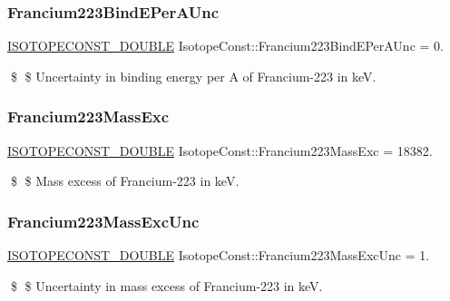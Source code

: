 \subsubsection{\texorpdfstring{Francium223\+Bind\+E\+Per\+A\+Unc}{Francium223BindEPerAUnc}}
{\footnotesize\ttfamily \mbox{\hyperlink{group___isotope_const-_macros_ga8f45a7272ce02c0b4c65c44636ed719a}{I\+S\+O\+T\+O\+P\+E\+C\+O\+N\+S\+T\+\_\+\+D\+O\+U\+B\+LE}} Isotope\+Const\+::\+Francium223\+Bind\+E\+Per\+A\+Unc = 0.}

\$ \$ Uncertainty in binding energy per A of Francium-\/223 in keV. \mbox{\label{group___isotope_const-_francium-_fr223_ga3b0e064faa8f2a4372383a56132e0f5d}} 
\subsubsection{\texorpdfstring{Francium223\+Mass\+Exc}{Francium223MassExc}}
{\footnotesize\ttfamily \mbox{\hyperlink{group___isotope_const-_macros_ga8f45a7272ce02c0b4c65c44636ed719a}{I\+S\+O\+T\+O\+P\+E\+C\+O\+N\+S\+T\+\_\+\+D\+O\+U\+B\+LE}} Isotope\+Const\+::\+Francium223\+Mass\+Exc = 18382.}

\$ \$ Mass excess of Francium-\/223 in keV. \mbox{\label{group___isotope_const-_francium-_fr223_ga5cfb08d0794e74ffe8cdfe5582f4e9ba}} 
\subsubsection{\texorpdfstring{Francium223\+Mass\+Exc\+Unc}{Francium223MassExcUnc}}
{\footnotesize\ttfamily \mbox{\hyperlink{group___isotope_const-_macros_ga8f45a7272ce02c0b4c65c44636ed719a}{I\+S\+O\+T\+O\+P\+E\+C\+O\+N\+S\+T\+\_\+\+D\+O\+U\+B\+LE}} Isotope\+Const\+::\+Francium223\+Mass\+Exc\+Unc = 1.}

\$ \$ Uncertainty in mass excess of Francium-\/223 in keV. \mbox{\label{group___isotope_const-_francium-_fr223_ga70e686daf9aa2d08dc565a1cffb10d00}} 
